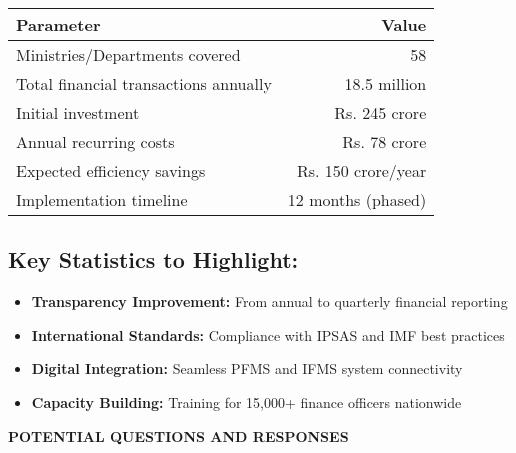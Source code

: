 \documentclass[12pt,a4paper]{article}
\newcommand{\talkingheader}[1]{\textbf{\color{govblue}#1}}
\begin{document}
\begin{table}[h]
\centering
\begin{tabular}{@{}lr@{}}
\toprule
\textbf{Parameter} & \textbf{Value} \\
\midrule
Ministries/Departments covered & 58 \\
Total financial transactions annually & 18.5 million \\
Initial investment & Rs. 245 crore \\
Annual recurring costs & Rs. 78 crore \\
Expected efficiency savings & Rs. 150 crore/year \\
Implementation timeline & 12 months (phased) \\
\bottomrule
\end{tabular}
\end{table}

\vspace{0.3cm}

\subsection*{Key Statistics to Highlight:}
\begin{itemize}[leftmargin=*, itemsep=3pt]
    \item[\ding{226}] \textbf{Transparency Improvement:} From annual to quarterly financial reporting
    \item[\ding{226}] \textbf{International Standards:} Compliance with IPSAS and IMF best practices
    \item[\ding{226}] \textbf{Digital Integration:} Seamless PFMS and IFMS system connectivity
    \item[\ding{226}] \textbf{Capacity Building:} Training for 15,000+ finance officers nationwide
\end{itemize}

\vspace{0.5cm}

\talkingheader{POTENTIAL QUESTIONS AND RESPONSES}
\end{document}
